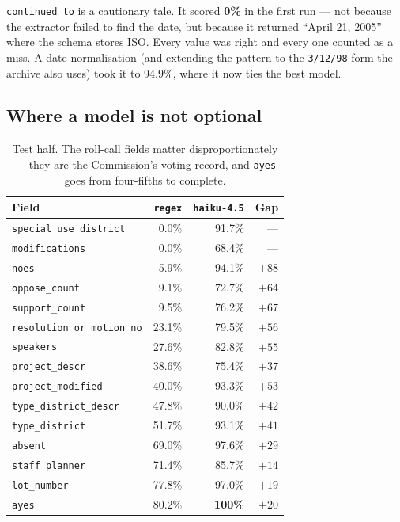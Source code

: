 \documentclass[11pt]{article}
\begin{document}
\texttt{continued\_to} is a cautionary tale. It scored \textbf{0\%} in the first run --- not
because the extractor failed to find the date, but because it returned ``April 21, 2005''
where the schema stores ISO. Every value was right and every one counted as a miss. A date
normalisation (and extending the pattern to the \texttt{3/12/98} form the archive also uses)
took it to 94.9\%, where it now ties the best model.

\subsection{Where a model is not optional}

\begin{table}[h]
\centering
\begin{tabular}{lrrr}
\toprule
Field & \texttt{regex} & \texttt{haiku-4.5} & Gap \\
\midrule
\texttt{special\_use\_district}     &  0.0\% &  91.7\% & --- \\
\texttt{modifications}              &  0.0\% &  68.4\% & --- \\
\texttt{noes}                       &  5.9\% &  94.1\% & $+88$ \\
\texttt{oppose\_count}              &  9.1\% &  72.7\% & $+64$ \\
\texttt{support\_count}             &  9.5\% &  76.2\% & $+67$ \\
\texttt{resolution\_or\_motion\_no} & 23.1\% &  79.5\% & $+56$ \\
\texttt{speakers}                   & 27.6\% &  82.8\% & $+55$ \\
\texttt{project\_descr}             & 38.6\% &  75.4\% & $+37$ \\
\texttt{project\_modified}          & 40.0\% &  93.3\% & $+53$ \\
\texttt{type\_district\_descr}      & 47.8\% &  90.0\% & $+42$ \\
\texttt{type\_district}             & 51.7\% &  93.1\% & $+41$ \\
\texttt{absent}                     & 69.0\% &  97.6\% & $+29$ \\
\texttt{staff\_planner}             & 71.4\% &  85.7\% & $+14$ \\
\texttt{lot\_number}                & 77.8\% &  97.0\% & $+19$ \\
\texttt{ayes}                       & 80.2\% & \textbf{100\%} & $+20$ \\
\bottomrule
\end{tabular}
\caption{Test half. The roll-call fields matter disproportionately --- they are the
Commission's voting record, and \texttt{ayes} goes from four-fifths to complete.}
\end{table}
\end{document}
